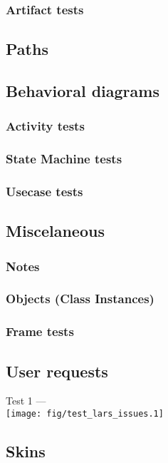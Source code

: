   \subsubsection{Artifact tests}

\subsection{Paths}

\subsection{Behavioral diagrams}
  \subsubsection{Activity tests}

  \subsubsection{State Machine tests}

  \subsubsection{Usecase tests}

\subsection{Miscelaneous}
  \subsubsection{Notes}
  \subsubsection{Objects (Class Instances)}

  \subsubsection{Frame tests}

\subsection{User requests}
  Test 1 --- \\ \texttt{[image: fig/test\_lars\_issues.1]} \\

\subsection{Skins}
